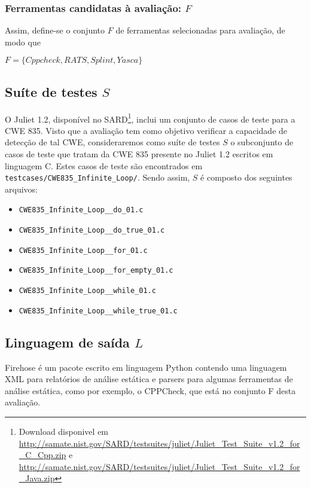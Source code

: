 \subsubsection{Ferramentas candidatas à avaliação: $F$}

Assim, define-se o conjunto $F$ de ferramentas selecionadas para avaliação, de modo que

$F = \lbrace Cppcheck, RATS, Splint, Yasca\rbrace$

\subsection{Suíte de testes $S$}

O Juliet 1.2, disponível no SARD\footnote{Download disponivel em \url{http://samate.nist.gov/SARD/testsuites/juliet/Juliet_Test_Suite_v1.2_for_C_Cpp.zip} e \url{http://samate.nist.gov/SARD/testsuites/juliet/Juliet_Test_Suite_v1.2_for_Java.zip}}, inclui um conjunto de casos de teste para a CWE 835. Visto que a avaliação tem como objetivo verificar a capacidade de detecção de tal CWE, consideraremos como suíte de testes $S$ o subconjunto de casos de teste que tratam da CWE 835 presente no Juliet 1.2 escritos em linguagem C. Estes casos de teste são encontrados em \lstinline{testcases/CWE835_Infinite_Loop/}. Sendo assim, $S$ é composto dos seguintes arquivos:
\begin{itemize}
  \item \lstinline{CWE835_Infinite_Loop__do_01.c}
  \item \lstinline{CWE835_Infinite_Loop__do_true_01.c}
  \item \lstinline{CWE835_Infinite_Loop__for_01.c}
  \item \lstinline{CWE835_Infinite_Loop__for_empty_01.c}
  \item \lstinline{CWE835_Infinite_Loop__while_01.c}
  \item \lstinline{CWE835_Infinite_Loop__while_true_01.c}
\end{itemize}

\subsection{Linguagem de saída $L$}

Firehose é um pacote escrito em linguagem Python contendo uma linguagem XML para relatórios de análise estática e parsers para algumas ferramentas de análise estática, como por exemplo, o CPPCheck, que está no conjunto F desta avaliação.

